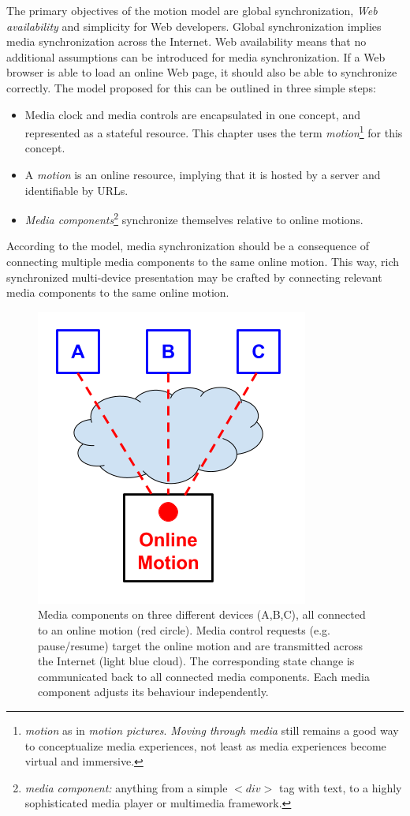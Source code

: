 The primary objectives of the motion model are global synchronization,
\emph{Web availability} and simplicity for Web developers. Global
synchronization implies media synchronization across the Internet. Web
availability means that no additional assumptions can be introduced for media
synchronization. If a Web browser is able to load an online Web page, it
should also be able to synchronize correctly. The model proposed for this can
be outlined in three simple steps:

\begin{itemize}
\item{Media clock and media controls are encapsulated in one concept, and
represented as a stateful resource. This chapter uses the term \emph{motion}\footnote{\emph{motion} as in \emph{motion pictures}. \emph{Moving through media} still remains a good way to conceptualize media experiences, not least as media experiences become virtual and immersive.
} for this
concept.} 
\item{A \emph{motion} is an online resource, implying that it is hosted by a
server and identifiable by URLs.}
\item{\emph{Media components}\footnote{\emph{media component:} anything from a simple $<div>$ tag with text, to a highly sophisticated media player or multimedia framework.
} synchronize themselves relative to online motions.}
\end{itemize}

According to the model, media synchronization should be a consequence of
connecting multiple media components to the same online motion. This way, rich
synchronized multi-device presentation may be crafted by connecting relevant
media components to the same online motion. 

\begin{figure}[h]
\centering
\includegraphics[scale=.4]{fig/motion-model.png}
\caption{Media components on three different devices (A,B,C), all connected to an online motion
(red circle). Media control requests (e.g. pause/resume) target the online motion and are transmitted across the Internet (light blue cloud). The corresponding state change is
communicated back to all connected media components. Each media component
adjusts its behaviour independently.}
\label{fig:model}
\end{figure}

